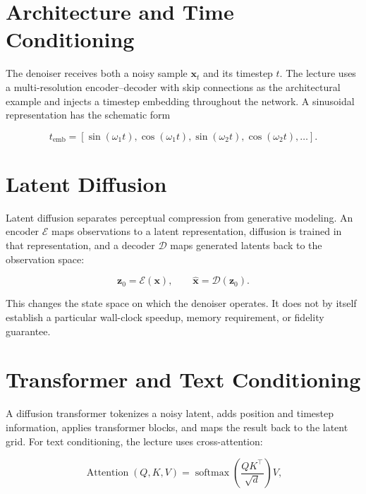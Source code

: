 \documentclass{article}
\begin{document}
\section{Architecture and Time Conditioning}

The denoiser receives both a noisy sample $\mathbf{x}_t$ and its timestep $t$.
The lecture uses a multi-resolution encoder--decoder with skip connections as the
architectural example and injects a timestep embedding throughout the network. A
sinusoidal representation has the schematic form

\[
t_{\mathrm{emb}}
=\left[
\sin(\omega_1t),\cos(\omega_1t),
\sin(\omega_2t),\cos(\omega_2t),\ldots
\right].
\]


\section{Latent Diffusion}

Latent diffusion separates perceptual compression from generative modeling. An encoder
$\mathcal{E}$ maps observations to a latent representation, diffusion is trained in
that representation, and a decoder $\mathcal{D}$ maps generated latents back to the
observation space:

\[
\mathbf{z}_0=\mathcal{E}(\mathbf{x}),
\qquad
\hat{\mathbf{x}}=\mathcal{D}(\mathbf{z}_0).
\]

This changes the state space on which the denoiser operates. It does not by itself
establish a particular wall-clock speedup, memory requirement, or fidelity guarantee.


\section{Transformer and Text Conditioning}

A diffusion transformer tokenizes a noisy latent, adds position and timestep
information, applies transformer blocks, and maps the result back to the latent grid.
For text conditioning, the lecture uses cross-attention:

\[
\operatorname{Attention}(Q,K,V)
=\operatorname{softmax}\!\left(\frac{QK^{\top}}{\sqrt d}\right)V,
\]
\end{document}
